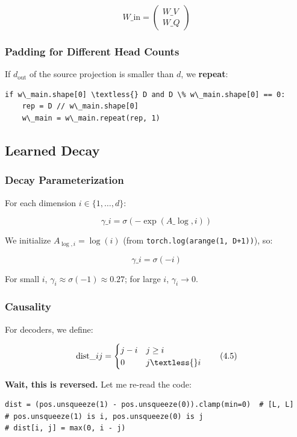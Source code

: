 \[
W\_\text{in} = \begin{pmatrix} W\_V \\ W\_Q \end{pmatrix}
\tag{4.2}
\]

\subsubsection{Padding for Different Head Counts}

If $d_\text{out}$ of the source projection is smaller than $d$, we \textbf{repeat}:

\begin{lstlisting}
if w\_main.shape[0] \textless{} D and D \% w\_main.shape[0] == 0:
    rep = D // w\_main.shape[0]
    w\_main = w\_main.repeat(rep, 1)
\end{lstlisting}

\subsection{Learned Decay}

\subsubsection{Decay Parameterization}

For each dimension $i \in \{1, \dots, d\}$:

\[
\gamma\_i = \sigma(-\exp(A\_{\log, i}))
\tag{4.3}
\]

We initialize $A_{\log, i} = \log(i)$ (from \texttt{torch.log(arange(1, D+1))}), so:

\[
\gamma\_i = \sigma(-i)
\tag{4.4}
\]

For small $i$, $\gamma_i \approx \sigma(-1) \approx 0.27$; for large $i$, 
$\gamma_i \to 0$.

\subsubsection{Causality}

For decoders, we define:

\[
\text{dist}\_{ij} = \begin{cases} j - i & j \geq i \\ 0 & j \textless{} i \end{cases}
\tag{4.5}
\]

\textbf{Wait, this is reversed.} Let me re-read the code:

\begin{lstlisting}
dist = (pos.unsqueeze(1) - pos.unsqueeze(0)).clamp(min=0)  # [L, L]
# pos.unsqueeze(1) is i, pos.unsqueeze(0) is j
# dist[i, j] = max(0, i - j)
\end{lstlisting}

